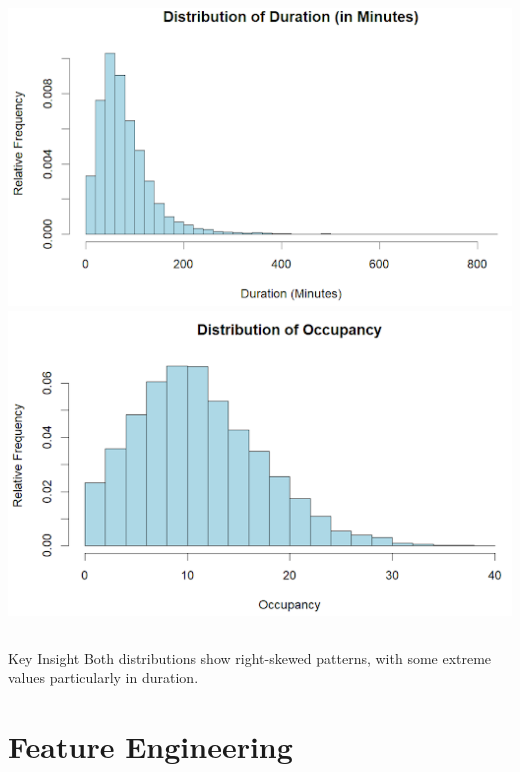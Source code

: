 \documentclass{beamer}
\begin{document}
\begin{frame}
\begin{columns}[T]
            \includegraphics[width=\textwidth, height=0.46\textheight]{images/eda/dist_duration.png}
            \vspace{0.3cm}
            \includegraphics[width=\textwidth, height=0.41\textheight]{images/eda/dist_occupancy.png}
        \end{columns}
    
        \begin{alertblock}{Key Insight}
            Both distributions show right-skewed patterns, with some extreme values particularly in duration.
        \end{alertblock}
\end{frame}


\section{Feature Engineering}
\end{document}
